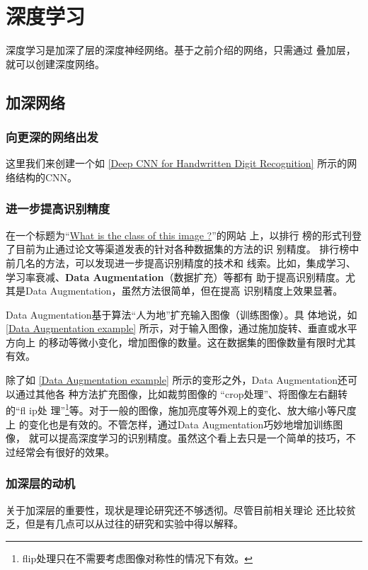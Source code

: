 \chapter{深度学习}
深度学习是加深了层的深度神经网络。基于之前介绍的网络，只需通过
叠加层，就可以创建深度网络。
\section{加深网络}

\subsection{向更深的网络出发}

这里我们来创建一个如 \autoref{Deep CNN for Handwritten Digit Recognition} 所示的网络结构的CNN。


\subsection{进一步提高识别精度}
在一个标题为“\href{https://rodrigob.github.io/are_we_there_yet/build/classification_datasets_results.html}{What is the class of this image ?}”的网站
上，以排行
榜的形式刊登了目前为止通过论文等渠道发表的针对各种数据集的方法的识
别精度。
排行榜中前几名的方法，可以发现进一步提高识别精度的技术和
线索。比如，集成学习、学习率衰减、\textbf{Data Augmentation}（数据扩充）等都有
助于提高识别精度。尤其是Data Augmentation，虽然方法很简单，但在提高
识别精度上效果显著。

Data Augmentation基于算法“人为地”扩充输入图像（训练图像）。具
体地说，如 \autoref{Data Augmentation example} 所示，对于输入图像，通过施加旋转、垂直或水平方向上
的移动等微小变化，增加图像的数量。这在数据集的图像数量有限时尤其有效。

除了如 \autoref{Data Augmentation example} 所示的变形之外，Data Augmentation还可以通过其他各
种方法扩充图像，比如裁剪图像的 “crop处理”、将图像左右翻转的“fl ip处
理”\footnote{flip处理只在不需要考虑图像对称性的情况下有效。}等。对于一般的图像，施加亮度等外观上的变化、放大缩小等尺度上
的变化也是有效的。不管怎样，通过Data Augmentation巧妙地增加训练图像，
就可以提高深度学习的识别精度。虽然这个看上去只是一个简单的技巧，不
过经常会有很好的效果。


\subsection{加深层的动机}
关于加深层的重要性，现状是理论研究还不够透彻。尽管目前相关理论
还比较贫乏，但是有几点可以从过往的研究和实验中得以解释。

